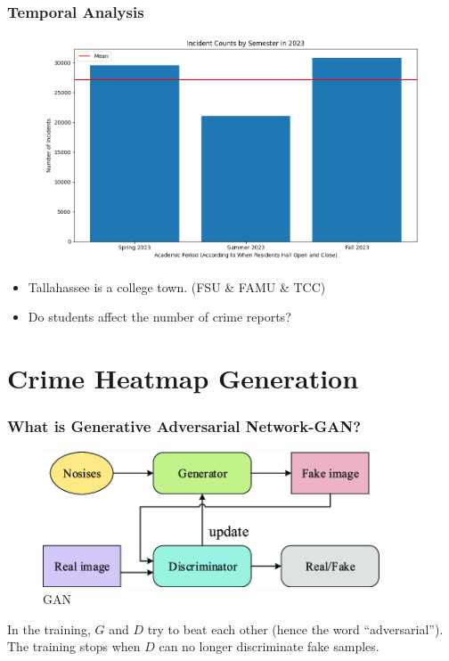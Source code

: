 \documentclass{beamer}
\begin{document}

\begin{frame}
    \frametitle{Temporal Analysis}
    \begin{figure}
        \flushleft
        \includegraphics[width=1\linewidth]{Figures/Incident Counts by Semester in 2023.png}
    \end{figure}
    {\scriptsize %
    \begin{itemize}
        \item Tallahassee is a college town. (FSU \& FAMU \& TCC)
        \item Do students affect the number of crime reports?
    \end{itemize}
    }
\end{frame}





\section{Crime Heatmap Generation}

\begin{frame}
    \frametitle{What is Generative Adversarial Network-GAN?}
    \begin{figure}
        \centering
        \includegraphics[width=10cm]{Figures/GAN.png}
        \caption{GAN}
        \label{gan}
    \end{figure}
    In the training, $G$ and $D$ try to beat each other (hence the word “adversarial”).\\
    The training stops when $D$ can no longer discriminate fake samples.

\end{frame}
\end{document}
